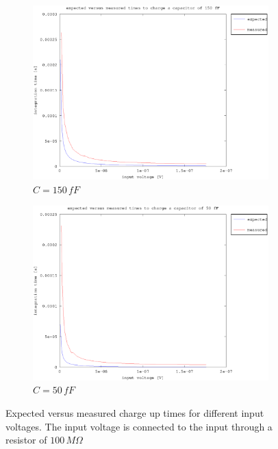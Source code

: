 \documentclass{article}
\begin{document}
\begin{figure}
\begin{subfigure}[b]{0.475\textwidth}
	    \centering 
	    \includegraphics[width=\textwidth]{fig/vin_vs_time_150fF.eps}
	    \caption[]%
	    {$C=150\,fF$}    
	    \label{fig:e_vs_m_150fF}
	\end{subfigure}
	\quad
	\begin{subfigure}[b]{0.475\textwidth}   
	    \centering 
	    \includegraphics[width=\textwidth]{fig/vin_vs_time_50fF.eps}
	    \caption[]%
	    {$C=50\,fF$}    
	    \label{fig:e_vs_m_50fF}
	\end{subfigure}
	\caption{Expected versus measured charge up times for different input voltages. The input voltage is connected to the input through a resistor of $100\,M\Omega$}
	\label{fig:e_vs_m}
\end{figure}
\end{document}
